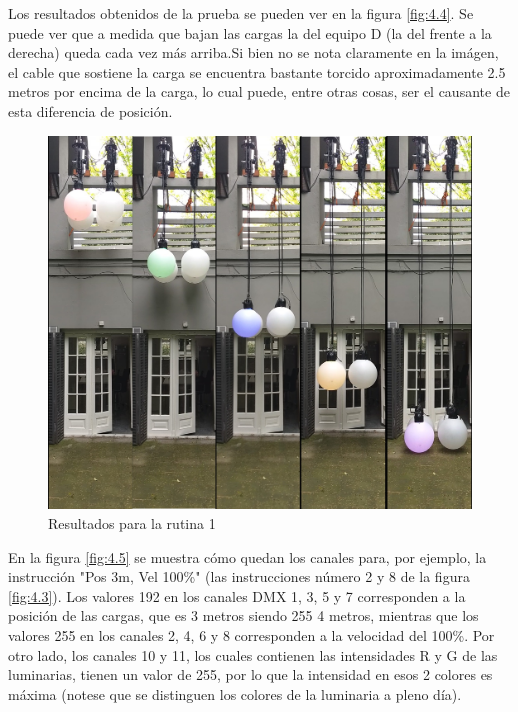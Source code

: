 Los resultados obtenidos de la prueba se pueden ver en la figura \ref{fig:4.4}. Se puede ver que a medida que bajan las cargas la del equipo D (la del frente a la derecha) queda cada vez más arriba.Si bien no se nota claramente en la imágen, el cable que sostiene la carga se encuentra bastante torcido aproximadamente 2.5 metros por encima de la carga, lo cual puede, entre otras cosas, ser el causante de esta diferencia de posición.

\begin{figure}[!ht]
	\centering
	\includegraphics[width=16cm,scale=1]{resources/4_4-cuelist1_resultados.jpg}
	\caption{Resultados para la rutina 1}
	\label{fig:\thefigure}
\end{figure}

En la figura \ref{fig:4.5} se muestra cómo quedan los canales para, por ejemplo, la instrucción "Pos 3m, Vel 100\%" (las instrucciones número 2 y 8 de la figura \ref{fig:4.3}). Los valores 192 en los canales DMX 1, 3, 5 y 7 corresponden a la posición de las cargas, que es 3 metros siendo 255 4 metros, mientras que los valores 255 en los canales 2, 4, 6 y 8 corresponden a la velocidad del 100\%. Por otro lado, los canales 10 y 11, los cuales contienen las intensidades R y G de las luminarias, tienen un valor de 255, por lo que la intensidad en esos 2 colores es máxima (notese que se distinguen los colores de la luminaria a pleno día).

